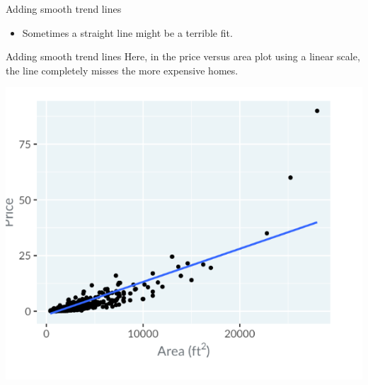 \documentclass[
  ignorenonframetext,
]{beamer}
\providecommand{\tightlist}{%
  \setlength{\itemsep}{0pt}\setlength{\parskip}{0pt}}
\begin{document}
\begin{frame}{Adding smooth trend lines}
\label{adding-smooth-trend-lines}
\begin{itemize}
\tightlist
\item
  Sometimes a straight line might be a terrible fit.
\end{itemize}
\end{frame}

\begin{frame}{Adding smooth trend lines}
\label{adding-smooth-trend-lines-1}
Here, in the price versus area plot using a linear scale, the line
completely misses the more expensive homes.

\includegraphics{../images/im38.png}
\end{frame}
\end{document}
